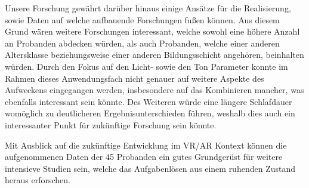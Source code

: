 Unsere Forschung gewährt darüber hinaus einige Ansätze für die Realisierung, sowie Daten auf welche aufbauende Forschungen fußen können. Aus diesem Grund wären weitere Forschungen interessant, welche sowohl eine höhere Anzahl an Probanden abdecken würden, als auch Probanden, welche einer anderen Altersklasse beziehungsweise einer anderen Bildungsschicht angehören, beinhalten würden. Durch den Fokus auf den Licht- sowie den Ton Parameter konnte im Rahmen dieses Anwendungsfach nicht genauer auf weitere Aspekte des Aufweckens eingegangen werden, insbesondere auf das Kombinieren mancher, was ebenfalls interessant sein könnte. Des Weiteren würde eine längere Schlafdauer womöglich zu deutlicheren Ergebnisunterschieden führen, weshalb dies auch ein interessanter Punkt für zukünftige Forschung sein könnte.

Mit Ausblick auf die zukünftige Entwicklung im VR/AR Kontext können die aufgenommenen Daten der 45 Probanden ein gutes Grundgerüst für weitere intensieve Studien sein, welche das Aufgabenlösen aus einem ruhenden Zustand heraus erforschen.